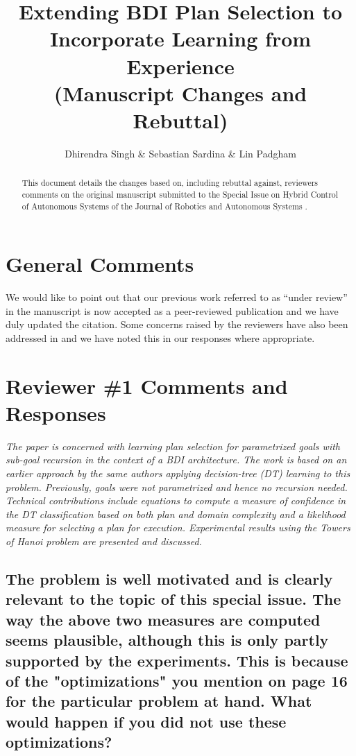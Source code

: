 \documentclass[preprint,12pt]{elsarticle}
\title{Extending BDI Plan Selection to Incorporate Learning from Experience\\(Manuscript Changes and Rebuttal)}
\author{Dhirendra Singh \& Sebastian Sardina \& Lin Padgham}
\begin{document}
\begin{abstract}
This document details the changes based on, including rebuttal against, reviewers comments on the original manuscript submitted to the Special Issue on Hybrid Control of Autonomous Systems of the Journal of Robotics and Autonomous Systems \cite{Singh:HYCAS10}.    
\end{abstract}

\maketitle

\section*{General Comments}

We would like to point out that our previous work referred to as ``under review'' in the manuscript  is now accepted as a peer-reviewed publication \cite{Singh:AAMAS10} and we have duly updated the citation. Some concerns raised by the reviewers have also been addressed in \cite{Singh:AAMAS10} and we have noted this in our responses where appropriate.

\section{Reviewer \#1 Comments and Responses}

{\em The paper is concerned with learning plan selection for parametrized goals with sub-goal recursion in the context of a BDI architecture. The work is based on an earlier approach by the same authors applying decision-tree (DT) learning to this problem. Previously, goals were not parametrized and hence no recursion needed. Technical contributions include equations to compute a measure of confidence in the DT classification based on both plan and domain complexity and a likelihood measure for selecting a plan for execution. Experimental results using the Towers of Hanoi problem are presented and discussed.}


\subsection{The problem is well motivated and is clearly relevant to the topic of this special issue. The way the above two measures are computed seems plausible, although this is only partly supported by the experiments. This is because of the "optimizations" you mention on page 16 for the particular problem at hand. What would happen if you did not use these optimizations?}
\label{rev1:optimisations}
\end{document}
